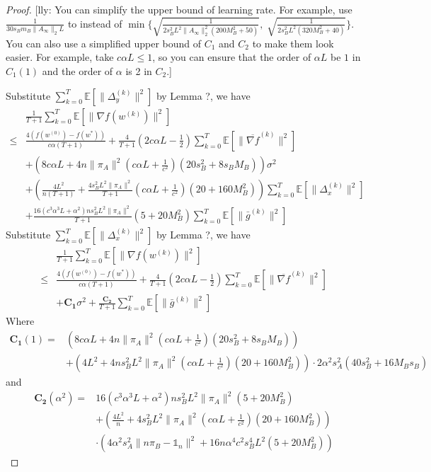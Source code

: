 \documentclass{article}
\newcommand{\EE}[1]{\mathbb{E}\left[#1\right]}
\newcommand{\norm}[1]{\| #1 \|}
\newcommand{\lly}[1]{{\color{red}[lly: #1]}}
\newcommand{\one}{\mathds{1}_n}
\begin{document}
\begin{proof}

\lly{You can simplify the upper bound of learning rate. For example, use $\frac{1}{30s_Bm_B\norm{A_\infty}_2L}$ to instead of  $\min\{\sqrt{\frac{1}{2s_B^2L^2\norm{A_{\infty}}_2^2(200M_B^2+50)}},\; \sqrt{\frac{1}{2s_B^2L^2(320M_B^2+40)}}\}$. You can also use a simplified upper bound of $C_1$ and $C_2$ to make them look easier. For example, take $c\alpha L \le 1$, so you can ensure that the order of $\alpha L$ be $1$ in $C_1(1)$ and the order of $\alpha$ is 2 in $C_2$.}

  Substitute $\sum_{k=0}^T\EE{\norm{\Delta_{y}^{(k)}}^2}$ by Lemma ?, we have
  \begin{align*}
    &\frac{1}{T+1}\sum_{k=0}^T\EE{\norm{\nabla f(w^{(k)})}^2}\\ 
  \leq & \frac{4(f(w^{(0)})-f(w^{*}))}{c\alpha(T+1)}+\frac{4}{T+1}\left(2c\alpha L-\frac{1}{2}\right)\sum_{k=0}^T\EE{\norm{\overline{\nabla f}^{(k)}}^2}\\&+\left(8c\alpha L+4n\norm{\pi_A}^2(c\alpha L +\frac{1}{c^2})(20s_B^2+8s_BM_B)\right)\sigma^2\\&+\left(\frac{ 4L^2}{n(T+1)}+\frac{4s_B^2L^2\norm{\pi_A}^2}{T+1}(c\alpha L+\frac{1}{c^2})(20+160M_B^2)\right)\sum_{k=0}^T\EE{\norm{\Delta_x^{(k)}}^2}\\&+\frac{16(c^3\alpha^3 L + \alpha^2)n s_B^2 L^2\norm{\pi_A}^2}{T+1}(5+20M_B^2)\sum_{k=0}^T\EE{\norm{\bar{g}^{(k)}}^2}
  \end{align*}
  Substitute $\sum_{k=0}^T\EE{\norm{\Delta_{x}^{(k)}}^2}$ by Lemma ?, we have
  \begin{align*}
    &\frac{1}{T+1}\sum_{k=0}^T\EE{\norm{\nabla f(w^{(k)})}^2}\\ 
  \leq & \frac{4(f(w^{(0)})-f(w^{*}))}{c\alpha(T+1)}+\frac{4}{T+1}\left(2c\alpha L-\frac{1}{2}\right)\sum_{k=0}^T\EE{\norm{\overline{\nabla f}^{(k)}}^2}\\&+\mathbf{C_1}\sigma^2+\frac{\mathbf{C_2}}{T+1}\sum_{k=0}^T\EE{\norm{\bar{g}^{(k)}}^2}
  \end{align*}
  Where 
  \begin{align*}
    \mathbf{C_1}(1)=&\left(8c\alpha L+4n\norm{\pi_A}^2(c\alpha L +\frac{1}{c^2})(20s_B^2+8s_BM_B)\right)\\&+\left(4L^2+4ns_B^2L^2\norm{\pi_A}^2(c\alpha L+\frac{1}{c^2})(20+160M_B^2)\right)\cdot 2\alpha^2s_A^2(40s_B^2+16M_Bs_B)
  \end{align*}
  and
  \begin{align*}
    \mathbf{C_2}(\alpha^2)=&16(c^3\alpha^3 L + \alpha^2)n s_B^2 L^2\norm{\pi_A}^2(5+20M_B^2)\\&+\left(\frac{ 4L^2}{n}+4s_B^2L^2\norm{\pi_A}^2(c\alpha L+\frac{1}{c^2})(20+160M_B^2)\right)\\ &\cdot \left(4\alpha^2s_A^2\norm{n\pi_B-\one}^2+16n\alpha^4c^2s_B^4L^2(5+20M_B^2) \right)

\end{align*}
\end{proof}
\end{document}
